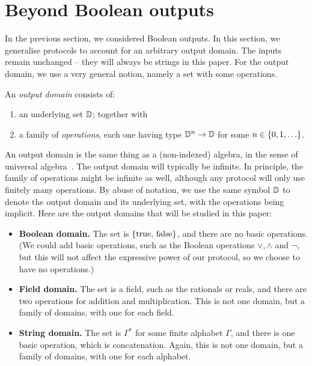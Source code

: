 \section{Beyond Boolean outputs}
\label{sec:beyond-boolean-outputs}

In the previous section, we considered Boolean outputs. In this section, we generalise protocols to account for an arbitrary output domain. The inputs remain unchanged -- they will always be strings in this paper.  For the output domain, we use a very general notion, namely a set with some operations. 
\begin{definition}
    An \emph{output domain} consists of: 
    \begin{enumerate}
        \item an underlying set $\mathbb D$; together with
        \item a family of \emph{operations}, each one having  type $\mathbb D^n \to \mathbb D$ for some $n \in \{0,1,\ldots\}$.
    \end{enumerate}
\end{definition}
An output domain is the same thing as a (non-indexed) algebra, in the sense of universal algebra~\cite[p.5]{hobby1988structure}. 
The output domain will typically  be infinite. In principle, the family of operations might be infinite as well, although any protocol will only use finitely many operations.
By abuse of notation, we use the same symbol $\mathbb D$ to denote the output domain and its underlying set, with the operations being implicit. Here are the output domains that will be studied in this paper: 
\begin{itemize}
    \item \textbf{Boolean domain.} The set is $\{\text{true, false}\}$, and there are no basic operations. (We could add basic operations, such as the Boolean operations $\lor,\land$ and $\neg$, but this will not affect the expressive power of our protocol, so we choose to have no operations.)
    \item \textbf{Field domain.} The set is a field, such as the rationals or reals, and there are two operations for addition and multiplication. This is not one domain, but a family of domains, with one for each field.
    \item \textbf{String domain.} The set is $\Gamma^*$ for some finite alphabet $\Gamma$, and there is one basic operation, which is concatenation. Again, this is not one domain, but a family of domains, with one for each alphabet.
\end{itemize}

